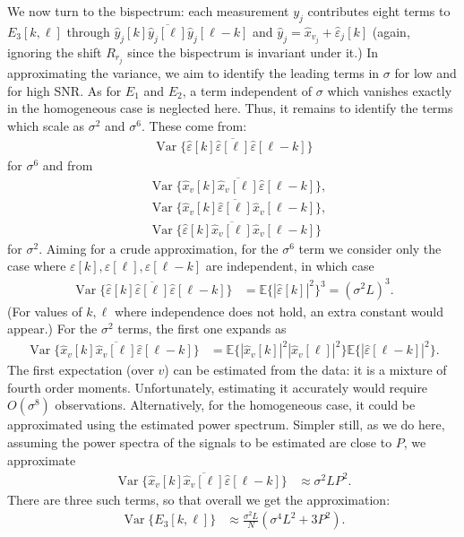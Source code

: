 \documentclass[english]{article}
\numberwithin{equation}{section}
\numberwithin{figure}{section}
\theoremstyle{plain}
\theoremstyle{definition}
\theoremstyle{remark}
\theoremstyle{plain}
\theoremstyle{remark}
\theoremstyle{plain}
\theoremstyle{plain}
\newcommand{\calO}{O}
\newcommand{\Var}{\operatorname{Var}}
\newcommand{\EE}{\mathbb{E}}
\begin{document}
We now turn to the bispectrum: each measurement $y_j$ contributes eight terms to $E_3[k, \ell]$ through $\hat y_j[k] \overline{\hat y_j[\ell]} \hat y_j[\ell-k]$ and $\hat y_j = \hat x_{v_j} + \hat  \varepsilon_{j}[k]$ (again, ignoring the shift $R_{r_j}$ since the bispectrum is invariant under it.) In approximating the variance, we aim to identify the leading terms in $\sigma$ for low and for high SNR. As for $E_1$ and $E_2$, a term independent of $\sigma$ which vanishes exactly in the homogeneous case is neglected here. Thus, it remains to identify the terms which scale as $\sigma^2$ and $\sigma^6$. These come from:
\begin{align*}
	\Var\{\hat \varepsilon[k] \overline{\hat \varepsilon[\ell]} \hat \varepsilon[\ell-k]\}
\end{align*}
for $\sigma^6$ and from
\begin{align*}
	& \Var\{\hat x_{v}[k] \overline{\hat x_{v}[\ell]} \hat \varepsilon[\ell-k]\}, \\
	& \Var\{\hat x_{v}[k] \overline{\hat \varepsilon[\ell]} \hat x_{v}[\ell-k]\}, \\ 
	& \Var\{\hat \varepsilon[k] \overline{\hat x_{v}[\ell]} \hat x_{v}[\ell-k]\}
\end{align*}
for $\sigma^2$. Aiming for a crude approximation, for the $\sigma^6$ term we consider only the case where $\varepsilon[k], \varepsilon[\ell], \varepsilon[\ell-k]$ are independent, in which case
\begin{align*}
	\Var\{\hat \varepsilon[k] \overline{\hat \varepsilon[\ell]} \hat \varepsilon[\ell-k]\} & = \EE\{ |\hat \varepsilon[k]|^2 \}^3 = (\sigma^2 L)^3.
\end{align*}
(For values of $k, \ell$ where independence does not hold, an extra constant would appear.) For the $\sigma^2$ terms, the first one expands as
\begin{align*}
	\Var\{\hat x_{v}[k] \overline{\hat x_{v}[\ell]} \hat \varepsilon[\ell-k]\} & = \EE\{|\hat x_{v}[k]|^2 |\hat x_{v}[\ell]|^2\} \EE\{|\hat \varepsilon[\ell-k]|^2\}.
\end{align*}
The first expectation (over $v$) can be estimated from the data: it is a mixture of fourth order moments. Unfortunately, estimating it accurately would require $\calO(\sigma ^8)$ observations. Alternatively, for the homogeneous case, it could be approximated using the estimated power spectrum. Simpler still, as we do here, assuming the power spectra of the signals to be estimated are close to $P$, we approximate
\begin{align*}
	\Var\{\hat x_{v}[k] \overline{\hat x_{v}[\ell]} \hat \varepsilon[\ell-k]\} & \approx \sigma^2 L P^2.
\end{align*}
There are three such terms, so that overall we get the approximation:
\begin{align*}
	\Var\{ E_3[k, \ell] \} & \approx \frac{\sigma^2 L}{N}\left( \sigma^4 L^2 + 3P^2 \right).
\end{align*}
\end{document}
